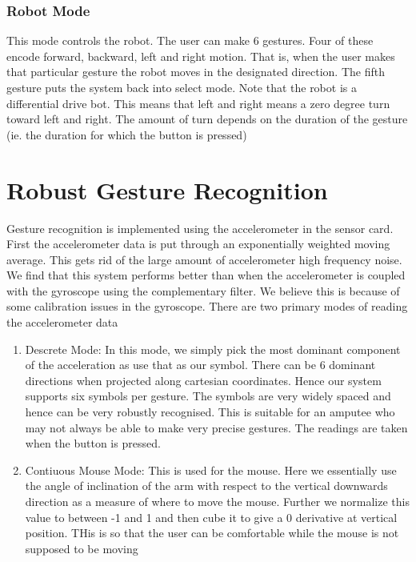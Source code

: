 \documentclass[12pt]{article}
\begin{document}
\subsubsection{Robot Mode}
This mode controls the robot. The user can make 6 gestures. Four of these encode forward, backward, left and right motion. That is, when the user makes that particular gesture the robot moves in the designated direction. The fifth gesture puts the system back into select mode. Note that the robot is a differential drive bot. This means that left and right means a zero degree turn toward left and right. The amount of turn depends on the duration of the gesture (ie. the duration for which the button is pressed)


\section{Robust Gesture Recognition}

Gesture recognition is implemented using the accelerometer in the sensor card. First the accelerometer data is put through an exponentially weighted moving average. This gets rid of the large amount of accelerometer high frequency noise. We find that this system performs better than when the accelerometer is coupled with the gyroscope using the complementary filter. We believe this is because of some calibration issues in the gyroscope. There are two primary modes of reading the accelerometer data
\begin{enumerate}
  \item Descrete Mode: In this mode, we simply pick the most dominant component of the acceleration as use that as our symbol. There can be 6 dominant directions when projected along cartesian coordinates. Hence our system supports six symbols per gesture. The symbols are very widely spaced and hence can be very robustly recognised. This is suitable for an amputee who may not always be able to make very precise gestures. The readings are taken when the button is pressed.
  \item Contiuous Mouse Mode: This is used for the mouse. Here we essentially use the angle of inclination of the arm with respect to the vertical downwards direction as a measure of where to move the mouse. Further we normalize this value to between -1 and 1 and then cube it to give a 0 derivative at vertical position. THis is so that the user can be comfortable while the mouse is not supposed to be moving
\end{enumerate}
\end{document}
